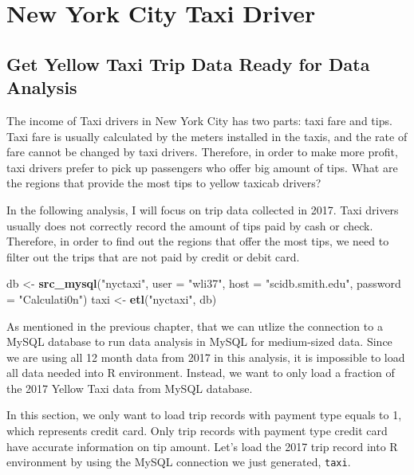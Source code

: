 \documentclass[12pt,twoside]{reedthesis}
\newenvironment{Shaded}{\begin{snugshade}}{\end{snugshade}}
\newcommand{\KeywordTok}[1]{\textcolor[rgb]{0.13,0.29,0.53}{\textbf{#1}}}
\newcommand{\DataTypeTok}[1]{\textcolor[rgb]{0.13,0.29,0.53}{#1}}
\newcommand{\DecValTok}[1]{\textcolor[rgb]{0.00,0.00,0.81}{#1}}
\newcommand{\StringTok}[1]{\textcolor[rgb]{0.31,0.60,0.02}{#1}}
\newcommand{\OtherTok}[1]{\textcolor[rgb]{0.56,0.35,0.01}{#1}}
\newcommand{\OperatorTok}[1]{\textcolor[rgb]{0.81,0.36,0.00}{\textbf{#1}}}
\newcommand{\NormalTok}[1]{#1}
\theoremstyle{definition}
\theoremstyle{definition}
\theoremstyle{definition}
\theoremstyle{remark}
\begin{document}
\chapter{New York City Taxi Driver}\label{chapter3}

\section{Get Yellow Taxi Trip Data Ready for Data
Analysis}\label{get-yellow-taxi-trip-data-ready-for-data-analysis}

The income of Taxi drivers in New York City has two parts: taxi fare and
tips. Taxi fare is usually calculated by the meters installed in the
taxis, and the rate of fare cannot be changed by taxi drivers.
Therefore, in order to make more profit, taxi drivers prefer to pick up
passengers who offer big amount of tips. What are the regions that
provide the most tips to yellow taxicab drivers?

In the following analysis, I will focus on trip data collected in 2017.
Taxi drivers usually does not correctly record the amount of tips paid
by cash or check. Therefore, in order to find out the regions that offer
the most tips, we need to filter out the trips that are not paid by
credit or debit card.
\begin{Shaded}
\begin{Highlighting}[]
\NormalTok{db <-}\StringTok{ }\KeywordTok{src_mysql}\NormalTok{(}\StringTok{"nyctaxi"}\NormalTok{, }\DataTypeTok{user =} \StringTok{"wli37"}\NormalTok{, }\DataTypeTok{host =} \StringTok{"scidb.smith.edu"}\NormalTok{, }
    \DataTypeTok{password =} \StringTok{"Calculati0n"}\NormalTok{)}
\NormalTok{taxi <-}\StringTok{ }\KeywordTok{etl}\NormalTok{(}\StringTok{"nyctaxi"}\NormalTok{, db)}
\end{Highlighting}
\end{Shaded}
As mentioned in the previous chapter, that we can utlize the connection
to a MySQL database to run data analysis in MySQL for medium-sized data.
Since we are using all 12 month data from 2017 in this analysis, it is
impossible to load all data needed into R environment. Instead, we want
to only load a fraction of the 2017 Yellow Taxi data from MySQL
database.

In this section, we only want to load trip records with payment type
equals to 1, which represents credit card. Only trip records with
payment type credit card have accurate information on tip amount. Let's
load the 2017 trip record into R environment by using the MySQL
connection we just generated, \texttt{taxi}.
\begin{Shaded}
\end{Shaded}
\end{document}
